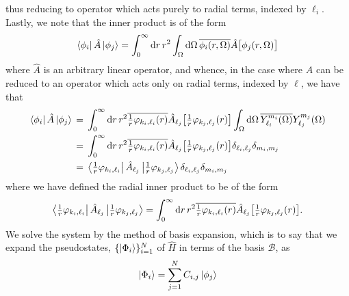 \documentclass[]{article}
\begin{document}
thus reducing to operator which acts purely to radial terms, indexed by
$\ell_{i}$.
Lastly, we note that the inner product is of the form
\begin{equation*}
  \bra{\phi_{i}}
  \hat{A}
  \ket{\phi_{j}}
  =
  \int_{0}^{\infty}
  \dd{r}
  {
    r^{2}
    \int_{\Omega}
    \dd{\Omega}
    {
      \overline
      {
        \phi_{i}\lr{r, \Omega}
      }
      \hat{A}
      \lrsq[\big]
      {
        \phi_{j}\lr{r, \Omega}
      }
    }
  }
\end{equation*}
where $\hat{A}$ is an arbitrary linear operator, and whence, in the case where
$\hat{A}$ can be reduced to an operator which acts only on radial terms, indexed
by $\ell$, we have that
\begin{alignat*}{2}
  \bra{\phi_{i}}
  \hat{A}
  \ket{\phi_{j}}
  {}={}
  &
  \int_{0}^{\infty}
  \dd{r}
  {
    r^{2}
    \overline
    {
      \tfrac{1}{r}
      \varphi_{k_{i}, \ell_{i}}\lr{r}
    }
    \hat{A}_{\ell_{j}}
    \lrsq[\big]
    {
      \tfrac{1}{r}
      \varphi_{k_{j}, \ell_{j}}\lr{r}
    }
  }
  \int_{\Omega}
  \dd{\Omega}
  {
    \overline
    {
      Y_{\ell_{i}}^{m_{i}}\lr{\Omega}
    }
    Y_{\ell_{j}}^{m_{j}}\lr{\Omega}
  }
  \\
  {}={}
  &
  \int_{0}^{\infty}
  \dd{r}
  {
    r^{2}
    \overline
    {
      \tfrac{1}{r}
      \varphi_{k_{i}, \ell_{i}}\lr{r}
    }
    \hat{A}_{\ell_{j}}
    \lrsq[\big]
    {
      \tfrac{1}{r}
      \varphi_{k_{j}, \ell_{j}}\lr{r}
    }
  }
  \delta_{\ell_{i}, \ell_{j}}
  \delta_{m_{i}, m_{j}}
  \\
  {}={}
  &
  \bra{\tfrac{1}{r}\varphi_{k_{i}, \ell_{i}}}
  \hat{A}_{\ell_{j}}
  \ket{\tfrac{1}{r}\varphi_{k_{j}, \ell_{j}}}
  \delta_{\ell_{i}, \ell_{j}}
  \delta_{m_{i}, m_{j}}
\end{alignat*}
where we have defined the radial inner product to be of the form
\begin{equation*}
  \bra{\tfrac{1}{r}\varphi_{k_{i}, \ell_{i}}}
  \hat{A}_{\ell_{j}}
  \ket{\tfrac{1}{r}\varphi_{k_{j}, \ell_{j}}}
  =
  \int_{0}^{\infty}
  \dd{r}
  {
    r^{2}
    \overline
    {
      \tfrac{1}{r}
      \varphi_{k_{i}, \ell_{i}}\lr{r}
    }
    \hat{A}_{\ell_{j}}
    \lrsq[\big]
    {
      \tfrac{1}{r}
      \varphi_{k_{j}, \ell_{j}}\lr{r}
    }
  }
  .
\end{equation*}
We solve the system by the method of basis expansion, which is to say that we
expand the pseudostates, $\lrset{\ket{\Phi_{i}}}_{i = 1}^{N}$ of $\hat{H}$ in
terms of the basis $\mathcal{B}$, as
\begin{equation*}
  \ket{\Phi_{i}}
  =
  \sum_{j = 1}^{N}
  C_{i, j}
  \ket{\phi_{j}}
\end{equation*}
\end{document}
